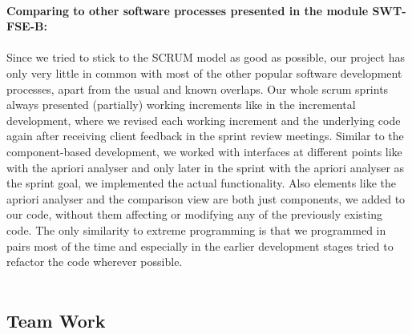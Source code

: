 \ \\
{\large\textbf{Comparing to other software processes presented in the module SWT-FSE-B:}}\\ 
\ \\
Since we tried to stick to the SCRUM model as good as possible, our project has only very little in common with most of the other popular software development processes, apart from the usual and known overlaps. Our whole scrum sprints always presented (partially) working increments like in the incremental development, where we revised each working increment and the underlying code again after receiving client feedback in the sprint review meetings. Similar to the component-based development, we worked with interfaces at different points like with the apriori analyser and only later in the sprint with the apriori analyser as the sprint goal, we implemented the actual functionality. Also elements like the apriori analyser and the comparison view are both just components, we added to our code, without them affecting or modifying any of the previously existing code. The only similarity to extreme programming is that we programmed in pairs most of the time and especially in the earlier development stages tried to refactor the code wherever possible.\\
\ \\


\subsection{Team Work}


